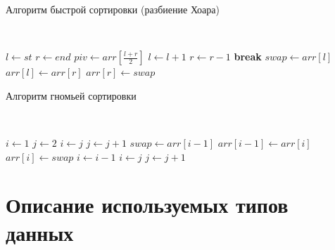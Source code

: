 \begin{algorithm}[H]
    \caption{Алгоритм быстрой сортировки (разбиение Хоара)}
    \label{alg:q-sort}
    \\

    \begin{algorithmic}[1]
            \State $l\gets st$
            \State $r\gets end$
            \State $piv\gets arr[\frac{l + r}{2}]$
            \Loop
                \Do
                    \State $l\gets l + 1$
                \Do
                    \State $r\gets r - 1$
                    \State \textbf{break}
                \EndIf
                \State $swap\gets arr[l]$
                \State $arr[l]\gets arr[r]$
                \State $arr[r]\gets swap$
            \EndLoop
            \State {}
            \State {}
        \EndIf
        \EndProcedure
    \end{algorithmic}
\end{algorithm}

\begin{algorithm}[H]
    \caption{Алгоритм гномьей сортировки}
    \label{alg:gnome-sort}
    \\

    \begin{algorithmic}[1]
        \State $i\gets 1$
        \State $j\gets 2$
                \State $i\gets j$
                \State $j\gets j + 1$
            \Else
                \State $swap\gets arr[i - 1]$
                \State $arr[i - 1]\gets arr[i]$
                \State $arr[i]\gets swap$
                \State $i\gets i - 1$
                    \State $i\gets j$
                    \State $j\gets j + 1$
                \EndIf
            \EndIf
        \EndWhile
        \EndProcedure
    \end{algorithmic}
\end{algorithm}

\section{Описание используемых типов данных}


